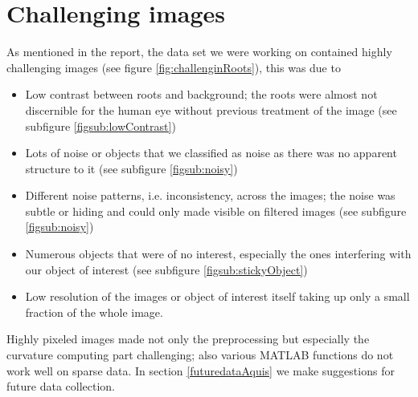 \section{Challenging images}\label{subsec:challengingImages}

As mentioned in the report, the data set we were working on contained highly challenging images (see figure \ref{fig:challenginRoots}), this was due to
\begin{itemize}
	\item Low contrast between roots and background; the roots were almost not discernible for the human eye without previous treatment of the image (see subfigure \ref{figsub:lowContrast})
	\item Lots of noise or objects that we classified as noise as there was no apparent structure to it (see subfigure \ref{figsub:noisy})
	\item Different noise patterns, i.e. inconsistency, across the images; the noise was subtle or hiding and could only made visible on filtered images (see subfigure \ref{figsub:noisy})
	\item Numerous objects that were of no interest, especially the ones interfering with our object of interest (see subfigure \ref{figsub:stickyObject})
	\item Low resolution of the images or object of interest itself taking up only a small fraction of the whole image. 
\end{itemize}
Highly pixeled images made not only the preprocessing but especially the curvature computing part challenging; also various MATLAB functions do not work well on sparse data.
In section \ref{futuredataAquis} we make suggestions for future data collection.

